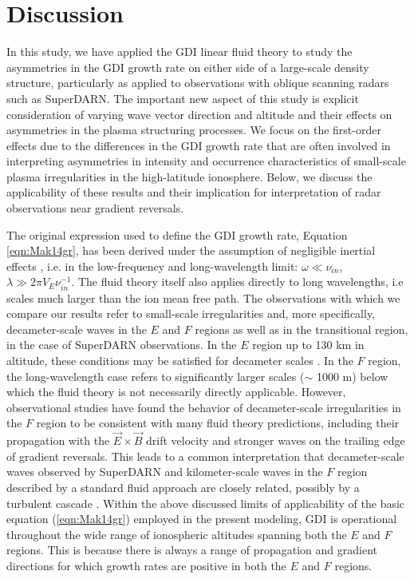 \section{Discussion}
\label{sec:p2discussion}
In this study, we have applied the GDI linear fluid theory to study the asymmetries in the GDI growth rate on either side of a large-scale density structure, particularly as applied to observations with oblique scanning radars such as SuperDARN.  The important new aspect of this study is explicit consideration of varying wave vector direction and altitude and their effects on asymmetries in the plasma structuring processes. We focus on the first-order effects due to the differences in the GDI growth rate that are often involved in interpreting asymmetries in intensity and occurrence characteristics of  small-scale plasma irregularities in the high-latitude ionosphere.  Below, we discuss the applicability of these results and their implication for interpretation of radar observations near gradient reversals.

The original expression used to define the GDI growth rate, Equation \ref{eqn:Mak14gr}, has been derived under the assumption of negligible inertial effects \citep{Makarevich2014c}, i.e. in the low-frequency and long-wavelength limit: \(\omega\ll \nu_{in}\), \(\lambda\gg 2\pi V_E \nu_{in}^{-1}\). The fluid theory itself also applies directly to long wavelengths, i.e scales much larger than the ion mean free path. The observations with which we compare our results refer to small-scale irregularities and, more specifically, decameter-scale waves in the \(E\) and \(F\) regions as well as in the transitional region, in the case of SuperDARN observations. In the \(E\) region up to 130 km in altitude, these conditions may be satisfied for decameter scales \citep[e.g.][]{Fejer1984}. In the \(F\) region, the long-wavelength case refers to significantly larger scales (\(\sim\) 1000 m) below which the fluid theory is not necessarily directly applicable. However, observational studies have found the behavior of decameter-scale irregularities in the \(F\) region to be consistent with many fluid theory predictions, including their propagation with the \(\vec{E}\times\vec{B}\) drift velocity and stronger waves on the trailing edge of gradient reversals. This leads to a common interpretation that decameter-scale waves observed by SuperDARN and  kilometer-scale waves in the \(F\) region described by a standard fluid approach are closely related, possibly by a turbulent cascade \citep[e.g.][]{Tsunoda1988}.  Within the above discussed limits of applicability of the basic equation (\ref{eqn:Mak14gr}) employed in the present modeling, GDI is operational throughout the wide range of ionospheric altitudes spanning both the \(E\) and \(F\) regions. This is because there is always a range of propagation and gradient directions for which growth rates are positive in both the \(E\) and \(F\) regions.




